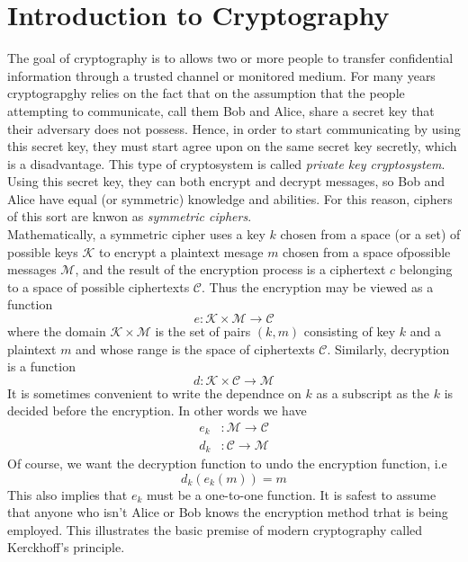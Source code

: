 \documentclass[a4 paper]{article}
\newcommand{\?}{\stackrel{?}{=}}
\begin{document}
\section{Introduction to Cryptography}
The goal of cryptography is to allows two or more people to transfer confidential information through a trusted channel or monitored medium. For many years cryptograpghy relies on the fact that  on the assumption that the people attempting to communicate, call them Bob and Alice, share a secret key that their adversary does not possess. Hence, in order to start communicating by using this secret key, they must start agree upon on the same secret key secretly, which is a disadvantage. This type of cryptosystem is called \textit{private key cryptosystem}. Using this secret key, they can both encrypt and decrypt messages, so Bob and Alice have equal (or symmetric) knowledge and abilities. For this reason, ciphers of this sort are knwon as \textit{symmetric ciphers}.   \\ 
Mathematically, a symmetric cipher uses a key $ k $ chosen from a space (or a set) of possible keys $ \mathcal{K} $ to encrypt a plaintext mesage $ m $ chosen from a space ofpossible messages $ \mathcal{M} $, and the result of the encryption process is a ciphertext $ c $ belonging to a space of possible ciphertexts $ \mathcal{C} $. Thus the encryption may be viewed as a function 
$$ e : \mathcal{K} \times \mathcal{M} \to \mathcal{C} $$
where the domain $ \mathcal{K} \times \mathcal{M} $ is the set of pairs $ (k,m) $ consisting of key $ k $ and a plaintext $ m $ and whose range is the space of ciphertexts $ \mathcal{C} $. Similarly, decryption is a function 
$$ d : \mathcal{K} \times \mathcal{C} \to \mathcal{M} $$
It is sometimes convenient to write the dependnce on $ k $ as a subscript as the $ k $ is decided before the encryption. In other words we have 
\begin{align*}
    e_k & : \mathcal{M} \to \mathcal{C} \\ 
    d_k & : \mathcal{C} \to \mathcal{M}
\end{align*}
Of course, we want the decryption function to undo the encryption function, i.e 
$$ d_k(e_k(m)) = m $$
This also implies that $ e_k $ must be a one-to-one function. It is safest to assume that anyone who isn't Alice or Bob knows the encryption method trhat is being employed. This illustrates the basic premise of modern cryptography called Kerckhoff's principle. 
\end{document}
